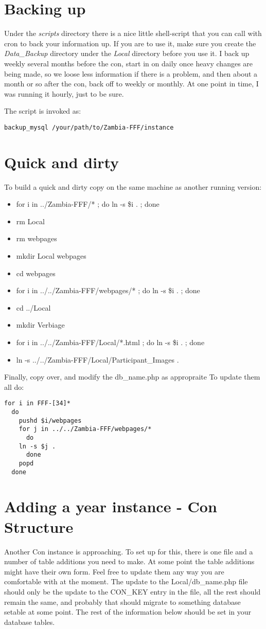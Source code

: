 \documentclass[captions=tablesignature]{scrartcl}
\begin{document}
\section{Backing up}
\label{sec-9}
Under the \emph{scripts} directory there is a nice little shell-script
that you can call with cron to back your information up.  If you are
to use it, make sure you create the \emph{Data\_Backup} directory under
the \emph{Local} directory before you use it.  I back up weekly several
months before the con, start in on daily once heavy changes are
being made, so we loose less information if there is a problem, and
then about a month or so after the con, back off to weekly or
monthly.  At one point in time, I was running it hourly, just to be
sure.

The script is invoked as:
\begin{verbatim}
backup_mysql /your/path/to/Zambia-FFF/instance
\end{verbatim}

\section{Quick and dirty}
\label{sec-10}
To build a quick and dirty copy on the same machine as another running version:
\begin{itemize}
\item for i in ../Zambia-FFF/* ; do ln -s \$i . ; done
\item rm Local
\item rm webpages
\item mkdir Local webpages
\item cd webpages
\item for i in ../../Zambia-FFF/webpages/* ; do ln -s \$i . ; done
\item cd ../Local
\item mkdir Verbiage
\item for i in ../../Zambia-FFF/Local/*.html ; do ln -s \$i . ; done
\item ln -s ../../Zambia-FFF/Local/Participant\_Images .
\end{itemize}
Finally, copy over, and modify the db\_name.php as appropraite
To update them all do:
\begin{verbatim}
for i in FFF-[34]*
  do
    pushd $i/webpages
    for j in ../../Zambia-FFF/webpages/*
      do
	ln -s $j .
      done
    popd
  done
\end{verbatim}

\section{Adding a year instance - Con Structure}
\label{sec-11}
Another Con instance is approaching.  To set up for this, there is
one file and a number of table additions you need to make.  At some
point the table additions might have their own form.  Feel free to
update them any way you are comfortable with at the moment.  The
update to the Local/db\_name.php file should only be the update to
the CON\_KEY entry in the file, all the rest should remain the same,
and probably that should migrate to something database setable at
some point.  The rest of the information below should be set in your
database tables.
\end{document}
